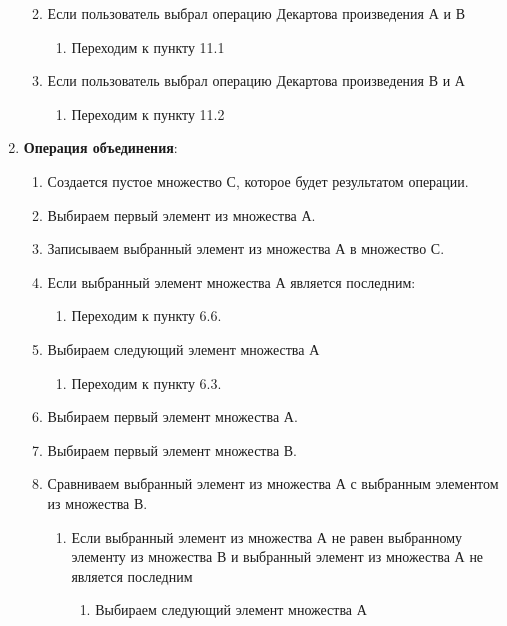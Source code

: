 \documentclass[a4paper,12pt]{extarticle}
\begin{document}
\begin{enumerate}
\begin{enumerate}[label*=\arabic*.]
\begin{enumerate}[label*=\arabic*.]
    \end{enumerate}
    \item Если пользователь выбрал операцию Декартова произведения А и В
    \begin{enumerate}[label*=\arabic*.]
      \item Переходим к пункту 11.1
    \end{enumerate}
    \item Если пользователь выбрал операцию Декартова произведения В и А
    \begin{enumerate}[label*=\arabic*.]
      \item Переходим к пункту 11.2
    \end{enumerate}
  \end{enumerate}
  \item \textbf{Операция объединения}:
  \begin{enumerate}[label*=\arabic*.]
    \item Создается пустое множество С, которое будет результатом операции.
    \item Выбираем первый элемент из множества А.
    \item Записываем выбранный элемент из множества А в множество С.
    \item Если выбранный элемент множества А является последним:
    \begin{enumerate}[label*=\arabic*.]
      \item Переходим к пункту 6.6.
    \end{enumerate}
    \item Выбираем следующий элемент множества А
    \begin{enumerate}[label*=\arabic*.]
      \item Переходим к пункту 6.3.
    \end{enumerate}
    \item Выбираем первый элемент множества А.
    \item Выбираем первый элемент множества В.
    \item Сравниваем выбранный элемент из множества А с выбранным элементом из множества В.
    \begin{enumerate}[label*=\arabic*.]
      \item Если выбранный элемент из множества А не равен выбранному элементу из множества В и выбранный элемент из множества А не является последним
      \begin{enumerate}[label*=\arabic*.]
        \item Выбираем следующий элемент множества А

\end{enumerate}
\end{enumerate}
\end{enumerate}
\end{enumerate}
\end{document}
